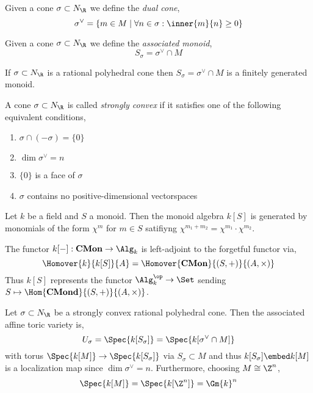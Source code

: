 \begin{defn}
Given a cone $\sigma \subset N_\R$ we define the \textit{dual cone},
\[ \sigma^\vee = \{ m \in M \mid \forall n \in \sigma : \inner{m}{n} \ge 0 \} \]
\end{defn}

\begin{defn}
Given a cone $\sigma \subset N_\R$ we define the \textit{associated monoid},
\[ S_\sigma = \sigma^\vee \cap M \]
\end{defn}

\begin{lemma}[Gordon]
If $\sigma \subset N_\R$ is a rational polyhedral cone then $S_\sigma = \sigma^\vee \cap M$ is a finitely generated monoid. 
\end{lemma}

\begin{defn}
A cone $\sigma \subset N_\R$ is called \textit{strongly convex} if it satisfies one of the following equivalent conditions,
\begin{enumerate}
\item $\sigma \cap (-\sigma) = \{ 0 \}$
\item $\dim{\sigma^\vee} = n$
\item $\{ 0 \}$ is a face of $\sigma$
\item $\sigma$ contains no positive-dimensional vectorspaces
\end{enumerate}
\end{defn}

\begin{defn}
Let $k$ be a field and $S$ a monoid. Then the monoid algebra $k[S]$ is generated by monomials of the form $\chi^m$ for $m \in S$ satifiyng $\chi^{m_1 + m_2} = \chi^{m_1} \cdot \chi^{m_2}$. 
\end{defn}

\begin{rmk}
The functor $k[-] : \mathbf{CMon} \to \Alg_k$ is left-adjoint to the forgetful functor via,
\[ \Homover{k}{k[S]}{A} = \Homover{\mathbf{CMon}}{(S, +)}{(A, \times)} \]
Thus $k[S]$ represents the functor $\Alg_k^\op \to \Set$ sending $S \mapsto \Hom{\mathbf{CMond}}{(S, +)}{(A, \times)}$.
\end{rmk}

\begin{defn}
Let $\sigma \subset N_\R$ be a strongly convex rational polyhedral cone. Then the associated affine toric variety is,
\[ U_\sigma = \Spec{k[S_\sigma]} = \Spec{k[\sigma^\vee \cap M]} \]
with torus $\Spec{k[M]} \to \Spec{k[S_\sigma]}$ via $S_\sigma \subset M$ and thus $k[S_\sigma] \embed k[M]$ is a localization map since $\dim{\sigma^\vee} = n$. Furthermore, choosing $M \cong \Z^n$,
\[ \Spec{k[M]} = \Spec{k[\Z^n]} = \Gm{k}^n \]
\end{defn}

